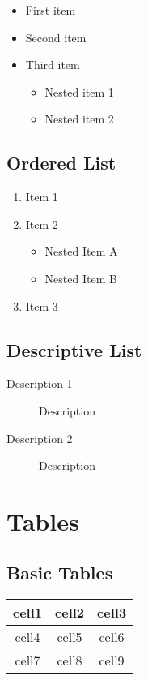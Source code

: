 \documentclass[14pt]{article}
\begin{document}
    \begin{itemize}
        \item First item
        \item Second item
        \item Third item
        \begin{itemize}
            \item Nested item 1
            \item Nested item 2
        \end{itemize}
    \end{itemize}

    \subsection{Ordered List}

    \begin{enumerate}
        \item Item 1
        \item Item 2
        \begin{itemize}
            \item Nested Item A
            \item Nested Item B
        \end{itemize}
        \item Item 3
    \end{enumerate}

    \subsection{Descriptive List}

    \begin{description}
        \item[Description 1] Description
        \item[Description 2] Description
    \end{description}

    \section{Tables}

    \subsection{Basic Tables}

    \begin{tabular} {| c c c |}
        \hline
        cell1 & cell2 & cell3 \\
        \hline
        \hline
        cell4 & cell5 & cell6 \\
        \hline
        cell7 & cell8 & cell9 \\
        \hline
    \end{tabular}
\end{document}

